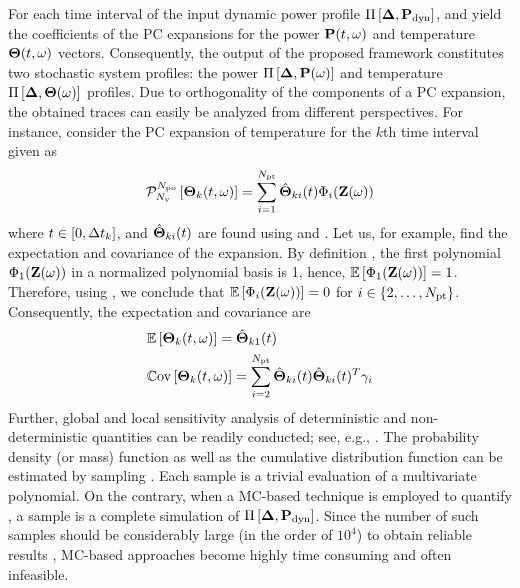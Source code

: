 For each time interval of the input dynamic power profile $\prof{\mP_\dyn}$,  and  yield the coefficients of the PC expansions for the power $\mathbf{P}(t, \omega)$ and temperature ${\boldsymbol\Theta}(t, \omega)$ vectors. Consequently, the output of the proposed framework constitutes two stochastic system profiles: the power $\prof{\mP(\o)}$ and temperature $\Pi\left[\boldsymbol{\Delta}, {\boldsymbol\Theta}(\omega)\right]$ profiles. Due to orthogonality of the components of a PC expansion, the obtained traces can easily be analyzed from different perspectives. For instance, consider the PC expansion of temperature for the $k$th time interval given as
\begin{equation} \elabel{pc-k}
  \oPC{\vars}{\pcorder}{\vTO_k(\t, \o)} = \sum_{i = 1}^{\pcterms} \pcc{\vTO}_{ki}(\t) \pcb_i(\vZ(\o))
\end{equation}
where $t \in [0, \Delta t_k]$, and $\hat{{\boldsymbol\Theta}}_{ki}(t)$ are found using  and . Let us, for example, find the expectation and covariance of the expansion. By definition \cite{xiu2002}, the first polynomial $\Phi_1(\mathbf{Z}(\omega))$ in a normalized polynomial basis is 1, hence, $\mathbb{E}\left[\Phi_1(\mathbf{Z}(\omega))\right] = 1$. Therefore, using , we conclude that $\mathbb{E}\left[\Phi_i(\mathbf{Z}(\omega))\right] = 0$ for $i \in \{ 2, \dotsc, {N_\text{pt}} \}$. Consequently, the expectation and covariance are
\begin{align*}
  & \mathbb{E}\left[{\boldsymbol\Theta}_k(t, \omega)\right] = \hat{{\boldsymbol\Theta}}_{k1}(t) \\
  & \mathbb{C}\text{ov}\left[{\boldsymbol\Theta}_k(t, \omega)\right] = \sum_{i = 2}^{{N_\text{pt}}} \hat{{\boldsymbol\Theta}}_{ki}(t) \hat{{\boldsymbol\Theta}}_{ki}(t)^T \gamma_i
\end{align*}
Further, global and local sensitivity analysis of deterministic and non-deterministic quantities can be readily conducted; see, e.g., \cite{eldred2009, maitre2010}. The probability density (or mass) function as well as the cumulative distribution function can be estimated by sampling . Each sample is a trivial evaluation of a multivariate polynomial. On the contrary, when a MC-based technique is employed to quantify , a sample is a complete simulation of $\prof{\mP_\dyn}$. Since the number of such samples should be considerably large (in the order of $10^4$) to obtain reliable results \cite{xiu2009}, MC-based approaches become highly time consuming and often infeasible.
